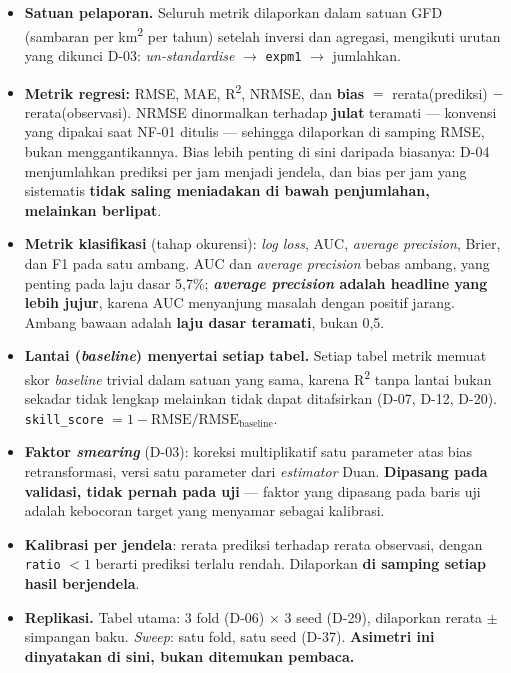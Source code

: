 \begin{itemize}
    \item \textbf{Satuan pelaporan.} Seluruh metrik dilaporkan dalam satuan GFD
          (sambaran per km\textsuperscript{2} per tahun) setelah inversi dan
          agregasi, mengikuti urutan yang dikunci D-03: \textit{un-standardise}
          $\rightarrow$ \texttt{expm1} $\rightarrow$ jumlahkan.
    \item \textbf{Metrik regresi:} RMSE, MAE, R\textsuperscript{2}, NRMSE, dan
          \textbf{bias} $=$ rerata(prediksi) $-$ rerata(observasi). NRMSE
          dinormalkan terhadap \textbf{julat} teramati --- konvensi yang dipakai
          saat NF-01 ditulis --- sehingga dilaporkan di samping RMSE, bukan
          menggantikannya. Bias lebih penting di sini daripada biasanya: D-04
          menjumlahkan prediksi per jam menjadi jendela, dan bias per jam yang
          sistematis \textbf{tidak saling meniadakan di bawah penjumlahan,
          melainkan berlipat}.
    \item \textbf{Metrik klasifikasi} (tahap okurensi): \textit{log loss},
          AUC, \textit{average precision}, Brier, dan F1 pada satu ambang.
          AUC dan \textit{average precision} bebas ambang, yang penting pada
          laju dasar 5,7\%; \textbf{\textit{average precision} adalah headline
          yang lebih jujur}, karena AUC menyanjung masalah dengan positif jarang.
          Ambang bawaan adalah \textbf{laju dasar teramati}, bukan 0,5.
    \item \textbf{Lantai (\textit{baseline}) menyertai setiap tabel.} Setiap
          tabel metrik memuat skor \textit{baseline} trivial dalam satuan yang
          sama, karena R\textsuperscript{2} tanpa lantai bukan sekadar tidak
          lengkap melainkan tidak dapat ditafsirkan (D-07, D-12, D-20).
          \texttt{skill\_score} $= 1 - \text{RMSE}/\text{RMSE}_{\text{baseline}}$.
    \item \textbf{Faktor \textit{smearing}} (D-03): koreksi multiplikatif satu
          parameter atas bias retransformasi, versi satu parameter dari
          \textit{estimator} Duan. \textbf{Dipasang pada validasi, tidak pernah
          pada uji} --- faktor yang dipasang pada baris uji adalah kebocoran
          target yang menyamar sebagai kalibrasi.
    \item \textbf{Kalibrasi per jendela}: rerata prediksi terhadap rerata
          observasi, dengan \texttt{ratio} $<1$ berarti prediksi terlalu rendah.
          Dilaporkan \textbf{di samping setiap hasil berjendela}.
    \item \textbf{Replikasi.} Tabel utama: 3 fold (D-06) $\times$ 3 seed (D-29),
          dilaporkan rerata $\pm$ simpangan baku. \textit{Sweep}: satu fold, satu
          seed (D-37). \textbf{Asimetri ini dinyatakan di sini, bukan ditemukan
          pembaca.}
\end{itemize}

